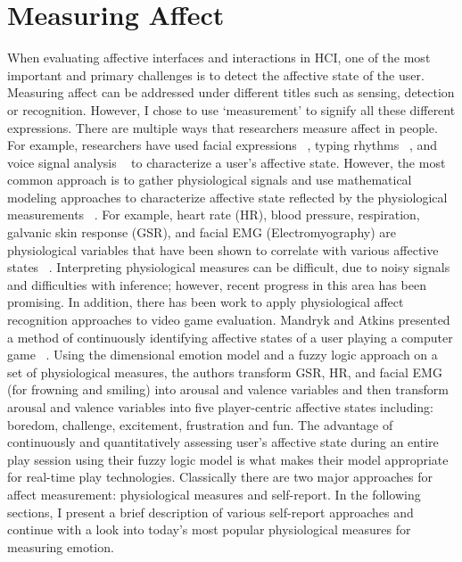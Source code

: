 \section{Measuring Affect}
When evaluating affective interfaces and interactions in HCI, one of the most important and primary challenges is to detect the affective state of the user. Measuring affect can be addressed under different titles such as sensing, detection or recognition. However, I chose to use `measurement' to signify all these different expressions. There are multiple ways that researchers measure affect in people. For example, researchers have used facial expressions ~\cite{partala2006real}, typing rhythms ~\cite{epp2011identifying}, and voice signal analysis ~\cite{picard2003affective} to characterize a user's affective state. However, the most common approach is to gather physiological signals and use mathematical modeling approaches to characterize affective state reflected by the physiological measurements ~\cite{mandryk2007fuzzy}. For example, heart rate (HR), blood pressure, respiration, galvanic skin response (GSR), and facial EMG (Electromyography) are physiological variables that have been shown to correlate with various affective states ~\cite{mandryk2008physiological}. Interpreting physiological measures can be difficult, due to noisy signals and difficulties with inference; however, recent progress in this area has been promising. In addition, there has been work to apply physiological affect recognition approaches to video game evaluation. Mandryk and Atkins presented a method of continuously identifying affective states of a user playing a computer game ~\cite{mandryk2007fuzzy}. Using the dimensional emotion model and a fuzzy logic approach on a set of physiological measures, the authors transform GSR, HR, and facial EMG (for frowning and smiling) into arousal and valence variables and then transform arousal and valence variables into five player-centric affective states including: boredom, challenge, excitement, frustration and fun. The advantage of continuously and quantitatively assessing user's affective state during an entire play session using their fuzzy logic model is what makes their model appropriate for real-time play technologies. Classically there are two major approaches for affect measurement: physiological measures and self-report. In the following sections, I present a brief description of various self-report approaches and continue with a look into today's most popular physiological measures for measuring emotion.

